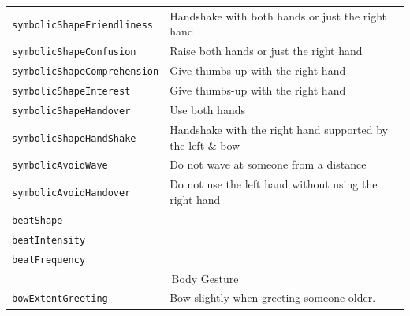 \documentclass{CSSRforAfrica}
\begin{document}
\begin{table}[H]
\begin{center}
\begin{tabular}{|l l|}
{\footnotesize \verb+symbolicShapeFriendliness+}  & {\footnotesize \verb++ Handshake with both hands or just the right hand}\vspace{-1.01mm} \\
{\footnotesize \verb+symbolicShapeConfusion+} 	                 & {\footnotesize \verb++ Raise  both hands or just the right hand}\vspace{-1.01mm} \\
{\footnotesize \verb+symbolicShapeComprehension+} 	                 & {\footnotesize \verb++ Give thumbs-up with the right hand}\vspace{-1.01mm} \\
{\footnotesize \verb+symbolicShapeInterest+} 	                 & {\footnotesize \verb++  Give thumbs-up with the right hand}\vspace{-1.01mm} \\
{\footnotesize \verb+symbolicShapeHandover+} 	                 & {\footnotesize \verb++ Use both hands}\vspace{-1.01mm} \\
{\footnotesize \verb+symbolicShapeHandShake+} 	                 & {\footnotesize \verb++ Handshake with the right hand supported by the left \& bow}\vspace{-1.01mm} \\
{\footnotesize \verb+symbolicAvoidWave+} 	                 & {\footnotesize \verb++ Do not wave at someone from a distance }\vspace{-1.01mm} \\
{\footnotesize \verb+symbolicAvoidHandover+} 	   & {\footnotesize \verb++ Do not use the left hand without using the right hand }\vspace{-1.01mm} \\
{\footnotesize \verb+beatShape+} 	                         & {\footnotesize \verb++}\vspace{-1.01mm} \\
{\footnotesize \verb+beatIntensity+} 	                 & {\footnotesize \verb++} \vspace{-1.01mm}\\
{\footnotesize \verb+beatFrequency+} 	                 & {\footnotesize \verb++} \\
\hline
\multicolumn{2}{|c|}{{\footnotesize Body Gesture}} \vspace{-0mm}\\
\hline
{\footnotesize \verb+bowExtentGreeting+} 	                        & {\footnotesize \verb++ Bow slightly when greeting someone older.} \vspace{-1.01mm}\\

\end{tabular}
\end{center}
\end{table}
\end{document}
